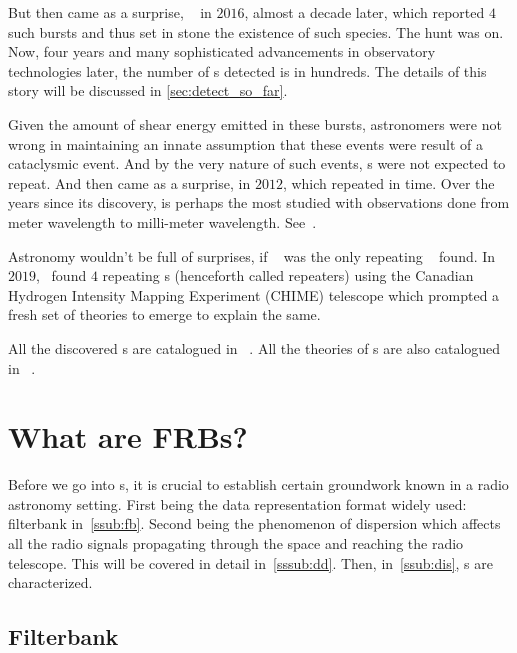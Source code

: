 \par But then came as a surprise, ~\cite{danburst4} in $2016$, almost a decade later, which reported $4$ such bursts and thus set in stone the existence of such species. The hunt was on.
Now, four years and many sophisticated advancements in observatory technologies later, the number of \frb{}s detected is in hundreds. The details of this story will be discussed in \autoref{sec:detect_so_far}.

\par Given the amount of shear energy emitted in these bursts, astronomers were not wrong in maintaining an innate assumption that these events were result of a cataclysmic event. And by the very nature of such events, \frb{}s were not expected to repeat. And then came as a surprise,  in $2012$, which repeated in time.
Over the years since its discovery,  is perhaps the most studied \frb{} with observations done from meter wavelength to milli-meter wavelength. See~\cite{spitler, palfa_frb}.

\par Astronomy wouldn't be full of surprises, if ~ was the only repeating \frb{}~ found. In $2019$,~\cite{chime_repeater8,chime_repeater9} found $4$ repeating \frb{}s (henceforth called repeaters) using the Canadian Hydrogen Intensity Mapping Experiment (CHIME) telescope which prompted a fresh set of theories to emerge to explain the same.

\par All the discovered \frb{}s are catalogued in ~\cite{frbcat}. All the theories of \frb{}s are also catalogued in ~\cite{frbtheorycat}.


\section{What are FRBs?}

\par Before we go into \frb{}s, it is crucial to establish certain groundwork known in a radio astronomy setting. 
First being the data representation format widely used: filterbank in~\autoref{ssub:fb}. 
Second being the phenomenon of dispersion which affects all the radio signals propagating through the space and reaching the radio telescope. 
This will be covered in detail in~\autoref{sssub:dd}. 
Then, in~\autoref{ssub:dis}, \frb{}s are characterized.

\subsection{Filterbank}
\label{ssub:fb}

